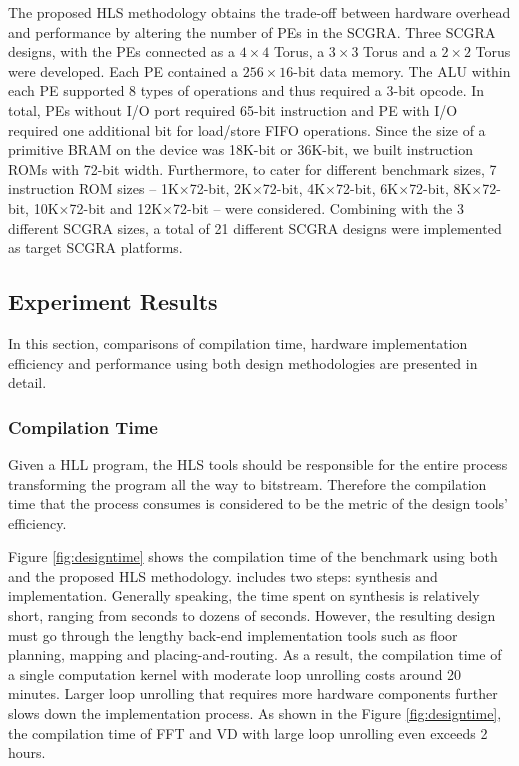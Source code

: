 The proposed HLS methodology obtains the trade-off between hardware overhead and performance by altering the number of PEs in the SCGRA. Three SCGRA designs, with the PEs connected as a $4 \times 4$ Torus, a $3 \times 3$ Torus and a $2 \times 2$ Torus were developed. Each PE contained a $256 \times 16$-bit data memory. The ALU within each PE supported 8 types of operations and thus required a 3-bit opcode.
In total, PEs without I/O port required 65-bit instruction and PE with I/O required one additional bit for load/store FIFO operations. Since the size of a primitive BRAM on the device was 18K-bit or 36K-bit, we built instruction ROMs with 72-bit width. Furthermore, to cater for different benchmark sizes, 7 instruction ROM sizes -- 1K$\times$72-bit, 2K$\times$72-bit, 4K$\times$72-bit, 6K$\times$72-bit, 8K$\times$72-bit, 10K$\times$72-bit and 12K$\times$72-bit -- were considered. Combining with the 3 different SCGRA sizes, a total of 21 different SCGRA designs were implemented as target SCGRA platforms.

\subsection{Experiment Results}
In this section, comparisons of compilation time, hardware implementation efficiency and performance using both design methodologies are presented in detail. 

\subsubsection{Compilation Time}
Given a HLL program, the HLS tools should be responsible for the entire process transforming the program all the way to bitstream. Therefore the compilation time that the process consumes is considered to be the metric of the design tools' efficiency. 

Figure \ref{fig:designtime} shows the compilation time of the benchmark using both \autoesl and the proposed HLS methodology. \autoesl includes two steps: \autoesl synthesis and \autoesl implementation. Generally speaking, the time spent on \autoesl synthesis is relatively short, ranging from seconds to dozens of seconds. However, the resulting design must go through the lengthy back-end implementation tools such as floor planning, mapping and placing-and-routing. As a result, the compilation time of a single computation kernel with moderate loop unrolling costs around 20 minutes. Larger loop unrolling that requires more hardware components further slows down the \autoesl implementation process. As shown in the Figure \ref{fig:designtime}, the compilation time of FFT and VD with large loop unrolling even exceeds 2 hours.

